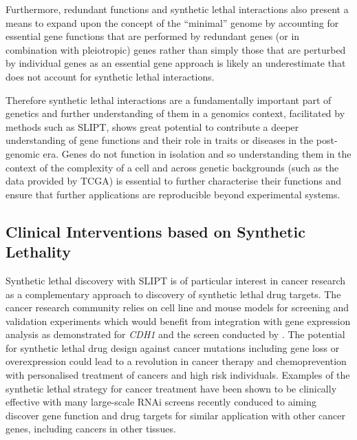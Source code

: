 Furthermore, redundant functions and synthetic lethal interactions also present a means to expand upon the concept of the ``minimal'' genome by accounting for essential gene functions that are performed by redundant genes (or in combination with pleiotropic) genes rather than simply those that are perturbed by individual genes as an essential gene approach is likely an underestimate that does not account for synthetic lethal interactions. 

Therefore synthetic lethal interactions are a fundamentally important part of genetics and further understanding of them in a genomics context, facilitated by methods such as \gls{SLIPT}, shows great potential to contribute a deeper understanding of gene functions and their role in traits or diseases in the post-genomic era. Genes do not function in isolation and so understanding them in the context of the complexity of a cell and across genetic backgrounds (such as the data provided by \gls{TCGA}) is essential to further characterise their functions and ensure that further applications are reproducible beyond experimental systems.


\subsection{Clinical Interventions based on Synthetic Lethality}
\label{chapt6:significance_clinic}

Synthetic lethal discovery with \gls{SLIPT} is of particular interest in cancer research as a complementary approach to discovery of synthetic lethal drug targets. The cancer research community relies on cell line and mouse models for screening and validation experiments \citep{Fece2015} which would benefit from integration with gene expression analysis as demonstrated for \textit{CDH1} and the screen conducted by \citet{Telford2015}. The potential for synthetic lethal drug design against cancer mutations including gene loss or overexpression could lead to a revolution in cancer therapy and chemoprevention with personalised treatment of cancers and high risk individuals.  Examples of the synthetic lethal strategy \citep{Farmer2005, Bryant2005} for cancer treatment have been shown to be clinically effective with many large-scale RNAi screens recently conduced to aiming discover gene function and drug targets for similar application with other cancer genes, including cancers in other tissues.

